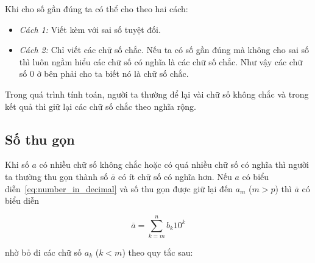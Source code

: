 \documentclass[../../Lectures.tex]{subfiles}
\begin{document}
Khi cho số gần đúng ta có thể cho theo hai cách:

\begin{itemize}
    \item \emph{Cách 1:} Viết kèm với sai số tuyệt đối.
    \item \emph{Cách 2:} Chỉ viết các chữ số chắc. Nếu ta có số gần đúng mà
        không cho sai số thì luôn ngầm hiểu các chữ số có nghĩa là các chữ số
        chắc. Như vậy các chữ số 0 ở bên phải cho ta biết nó là chữ số chắc.
\end{itemize}

Trong quá trình tính toán, người ta thường để lại vài chữ số không chắc và trong
kết quả thì giữ lại các chữ số chắc theo nghĩa rộng.

\subsection{Số thu gọn}

Khi số \(a\) có nhiều chữ số không chắc hoặc có quá nhiều chữ số có nghĩa thì
người ta thường thu gọn thành số \(\overline{a}\) có ít chữ số có nghĩa hơn. Nếu
\(a\) có biểu diễn~\ref{eq:number_in_decimal} và số thu gọn được giữ lại đến
\(a_m\) (\(m > p\)) thì \(\overline{a}\) có biểu diễn

\begin{equation}
    \overline{a} = \sum_{k=m}^{n} b_k 10^k
\end{equation}

nhờ bỏ đi các chữ số \(a_k\) (\(k < m\)) theo quy tắc sau:
\end{document}
